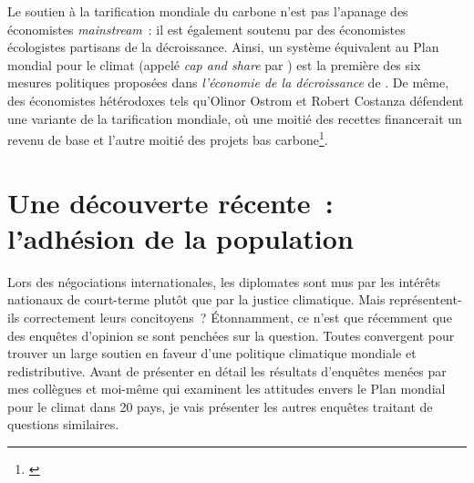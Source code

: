 \documentclass[a5paper,french]{memoir}
\begin{document}
Le soutien à la tarification mondiale du carbone n'est pas l'apanage des économistes \textit{mainstream}~: il est également soutenu par des économistes  écologistes partisans de la décroissance. Ainsi, un système équivalent au Plan mondial pour le climat (appelé \textit{cap and share} par \cite{douthwaite_degrowth_2012}) est la première des six mesures politiques proposées dans \textit{l'économie de la décroissance} de \cite{kallis_economics_2012}. De même, des économistes hétérodoxes tels qu'Olinor Ostrom et Robert Costanza défendent une variante de la tarification mondiale, où une moitié des recettes  financerait un revenu de base et l'autre moitié des projets bas carbone\footnote{\cite{barnes_creating_2008}}.%

\section{Une découverte récente~: l'adhésion de la population} 

Lors des négociations internationales, les diplomates sont mus par les intérêts nationaux de court-terme plutôt que par la justice climatique. Mais représentent-ils correctement leurs concitoyens~? %
Étonnamment, ce n'est que récemment que des enquêtes d'opinion se sont penchées sur la question. Toutes convergent pour trouver un large soutien en faveur d'une politique climatique mondiale et redistributive. Avant de présenter en détail les résultats d'enquêtes menées par mes collègues et moi-même qui examinent les attitudes envers le Plan mondial pour le climat dans 20 pays, %
je vais présenter les autres enquêtes traitant de questions similaires. 
\end{document}
